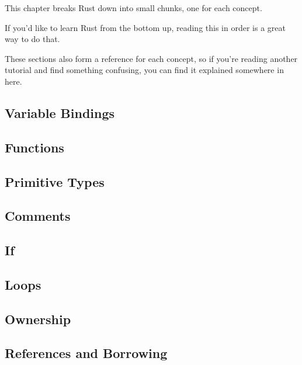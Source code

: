 This chapter breaks Rust down into small chunks, one for each concept.

\blank

If you'd like to learn Rust from the bottom up, reading this in order is a great way to do that.

\blank

These sections also form a reference for each concept, so if you're reading another tutorial and find something confusing, 
you can find it explained somewhere in here.

\subsection{Variable Bindings}
\label{sec:syntax_variableBindings}


\subsection{Functions}
\label{sec:syntax_functions}


\subsection{Primitive Types}
\label{sec:syntax_primitives}


\subsection{Comments}
\label{sec:syntax_comments}


\subsection{If}
\label{sec:syntax_if}


\subsection{Loops}
\label{sec:syntax_loops}


\subsection{Ownership}
\label{sec:syntax_ownership}


\subsection{References and Borrowing}
\label{sec:syntax_referencesBorrowing}


